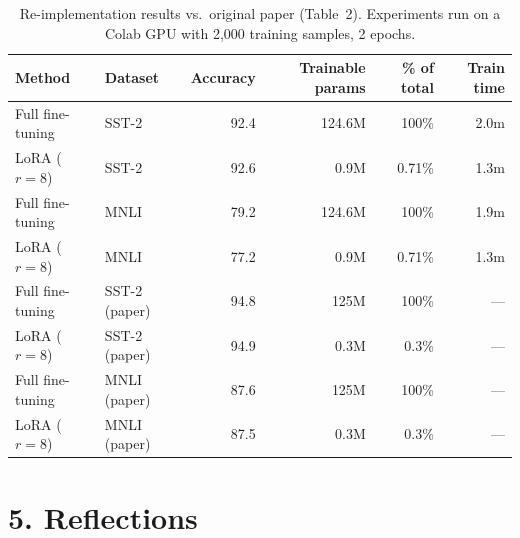 \documentclass[11pt]{article}
\begin{document}
\begin{table}[h]
\centering
\small
\begin{tabular}{llrrrr}
  \toprule
  Method & Dataset & Accuracy & Trainable params & \% of total & Train time \\
  \midrule
  Full fine-tuning & SST-2  & 92.4 & 124.6M & 100\%  & 2.0m \\
  LoRA ($r=8$)     & SST-2  & 92.6 & 0.9M & 0.71\% & 1.3m \\
  Full fine-tuning & MNLI   & 79.2 & 124.6M & 100\%  & 1.9m \\
  LoRA ($r=8$)     & MNLI   & 77.2 & 0.9M & 0.71\% & 1.3m \\
  \midrule
  Full fine-tuning & SST-2 (paper) & 94.8 & 125M & 100\% & --- \\
  LoRA ($r=8$)     & SST-2 (paper) & 94.9 & 0.3M & 0.3\% & --- \\
  Full fine-tuning & MNLI  (paper) & 87.6 & 125M & 100\% & --- \\
  LoRA ($r=8$)     & MNLI  (paper) & 87.5 & 0.3M & 0.3\% & --- \\
  \bottomrule
\end{tabular}
\caption{Re-implementation results vs.\ original paper (Table~2). Experiments
run on a Colab GPU with 2,000 training samples, 2 epochs.}
\end{table}


\section*{5. Reflections}



\end{document}
